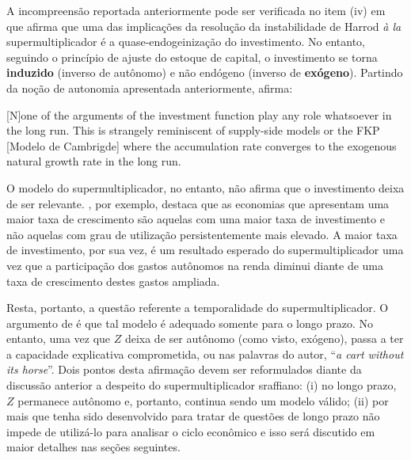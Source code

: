 A incompreensão reportada anteriormente pode ser verificada no item (iv) em que afirma que uma das implicações da resolução da instabilidade de Harrod \textit{à la} supermultiplicador é a quase-endogeinização do investimento. No entanto, seguindo o princípio de ajuste do estoque de capital, o investimento se torna \textbf{induzido} (inverso de autônomo) e não endógeno (inverso de \textbf{exógeno}). Partindo da noção de autonomia apresentada anteriormente, \citeauthor*{nikiforos_comments_2018} afirma:
\begin{citacao}
	
	[N]one of the arguments of the investment function play any role whatsoever in the long run. This is strangely
	reminiscent of supply-side models or the FKP [Modelo de Cambrigde] where the accumulation rate converges to the
	exogenous natural growth rate in the long run. \cite[p.~11--12, comentario adicionado]{nikiforos_comments_2018}
\end{citacao}
O modelo do supermultiplicador, no entanto, não afirma que o investimento deixa de ser relevante. \textcite{dejuan_hidden_2017}, por exemplo, destaca que as economias que apresentam uma maior taxa de crescimento são aquelas com uma maior taxa de investimento e não aquelas com grau de utilização persistentemente mais elevado. A maior taxa de investimento, por sua vez, é um resultado esperado do supermultiplicador uma vez que a participação dos gastos autônomos na renda diminui diante de uma taxa de crescimento destes gastos ampliada.

Resta, portanto, a questão referente a temporalidade do supermultiplicador. O argumento de \citeauthor*{nikiforos_comments_2018} é que tal modelo é adequado somente para o longo prazo. No entanto, uma vez que $Z$ deixa de ser autônomo (como visto, exógeno), passa a ter a capacidade explicativa comprometida, ou nas palavras do autor, ``\textit{a cart without its horse}''. Dois pontos desta afirmação devem ser reformulados diante da discussão anterior a despeito do supermultiplicador sraffiano: (i) no longo prazo, $Z$ permanece autônomo e, portanto, continua sendo um modelo válido; (ii) por mais que tenha sido desenvolvido para tratar de questões de longo prazo não impede de utilizá-lo para analisar o ciclo econômico e isso será discutido em maior detalhes nas seções seguintes. 

